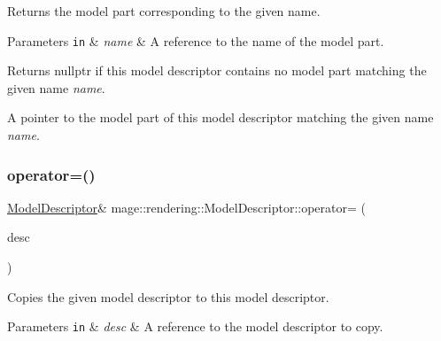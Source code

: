 Returns the model part corresponding to the given name.


\begin{DoxyParams}[1]{Parameters}
\mbox{\tt in}  & {\em name} & A reference to the name of the model part. \\
\hline
\end{DoxyParams}
\begin{DoxyReturn}{Returns}
{\ttfamily nullptr} if this model descriptor contains no model part matching the given name {\itshape name}. 

A pointer to the model part of this model descriptor matching the given name {\itshape name}. 
\end{DoxyReturn}
\mbox{\label{classmage_1_1rendering_1_1_model_descriptor_a6d27a72aa2ebffbe4e7f2635f803dd72}} 
\subsubsection{\texorpdfstring{operator=()}{operator=()}\hspace{0.1cm}{\footnotesize\ttfamily [1/2]}}
{\footnotesize\ttfamily \mbox{\hyperlink{classmage_1_1rendering_1_1_model_descriptor}{Model\+Descriptor}}\& mage\+::rendering\+::\+Model\+Descriptor\+::operator= (\begin{DoxyParamCaption}\item[{const \mbox{\hyperlink{classmage_1_1rendering_1_1_model_descriptor}{Model\+Descriptor}} \&}]{desc }\end{DoxyParamCaption})\hspace{0.3cm}{\ttfamily [delete]}}

Copies the given model descriptor to this model descriptor.


\begin{DoxyParams}[1]{Parameters}
\mbox{\tt in}  & {\em desc} & A reference to the model descriptor to copy. \\
\hline
\end{DoxyParams}
\mbox{\label{classmage_1_1rendering_1_1_model_descriptor_a52e9fbf292efc7a803d367bb3b6cb962}} 
